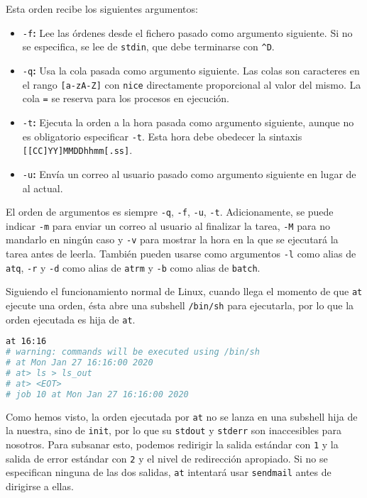 Esta orden recibe los siguientes argumentos:

\begin{itemize}
	\item\texttt{-f}\textbf{:} Lee las órdenes desde el fichero pasado como argumento siguiente. Si no se especifica, se lee de \texttt{stdin}, que debe terminarse con \texttt{\^{}D}.
	\item\texttt{-q}\textbf{:} Usa la cola pasada como argumento siguiente. Las colas son caracteres en el rango \texttt{[a-zA-Z]} con \texttt{nice} directamente proporcional al valor del mismo. La cola \texttt{=} se reserva para los procesos en ejecución.
	\item\texttt{-t}\textbf{:} Ejecuta la orden a la hora pasada como argumento siguiente, aunque no es obligatorio especificar \texttt{-t}. Esta hora debe obedecer la sintaxis \texttt{[[CC]YY]MMDDhhmm[.ss]}.
	\item\texttt{-u}\textbf{:} Envía un correo al usuario pasado como argumento siguiente en lugar de al actual.
\end{itemize}

El orden de argumentos es siempre \texttt{-q}, \texttt{-f}, \texttt{-u}, \texttt{-t}.
Adicionamente, se puede indicar \texttt{-m} para enviar un correo al usuario al finalizar la tarea, \texttt{-M} para no mandarlo en ningún caso y \texttt{-v} para mostrar la hora en la que se ejecutará la tarea antes de leerla.
También pueden usarse como argumentos \texttt{-l} como alias de \texttt{atq}, \texttt{-r} y \texttt{-d} como alias de \texttt{atrm} y \texttt{-b} como alias de \texttt{batch}.

Siguiendo el funcionamiento normal de Linux, cuando llega el momento de que \texttt{at} ejecute una orden, ésta abre una subshell \texttt{/bin/sh} para ejecutarla, por lo que la orden ejecutada es hija de \texttt{at}.

\begin{lstlisting}[language=Bash]
at 16:16
# warning: commands will be executed using /bin/sh
# at Mon Jan 27 16:16:00 2020
# at> ls > ls_out
# at> <EOT>
# job 10 at Mon Jan 27 16:16:00 2020
\end{lstlisting}

Como hemos visto, la orden ejecutada por \texttt{at} no se lanza en una subshell hija de la nuestra, sino de \texttt{init}, por lo que su \texttt{stdout} y \texttt{stderr} son inaccesibles para nosotros.
Para subsanar esto, podemos redirigir la salida estándar con \texttt{1} y la salida de error estándar con \texttt{2} y el nivel de redirección apropiado.
Si no se especifican ninguna de las dos salidas, \texttt{at} intentará usar \texttt{sendmail} antes de dirigirse a ellas.

